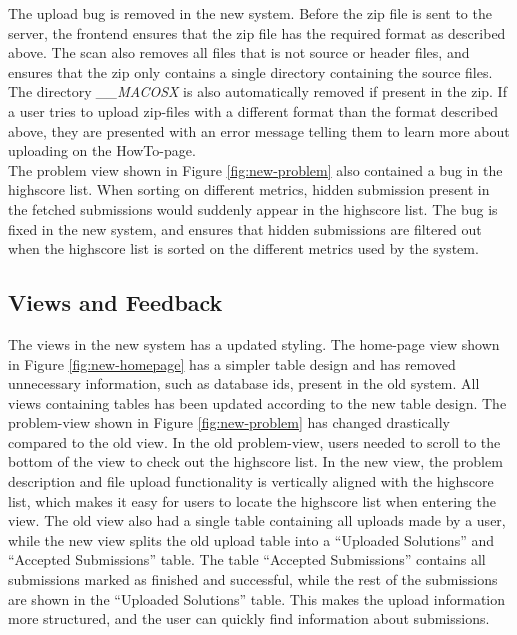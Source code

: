 The upload bug is removed in the new system. Before the zip file is sent to the server, the frontend ensures that the zip file has the required format as described above. The scan also removes all files that is not source or header files, and ensures that the zip only contains a single directory containing the source files. The directory \textit{\_\_MACOSX} is also automatically removed if present in the zip. If a user tries to upload zip-files with a different format than the format described above, they are presented with an error message telling them to learn more about uploading on the HowTo-page. \\

The problem view shown in Figure \ref{fig:new-problem} also contained a bug in the highscore list. When sorting on different metrics, hidden submission present in the fetched submissions would suddenly appear in the highscore list. The bug is fixed in the new system, and ensures that hidden submissions are filtered out when the highscore list is sorted on the different metrics used by the system.

\subsection{Views and Feedback}
The views in the new system has a updated styling. The home-page view shown in Figure \ref{fig:new-homepage} has a simpler table design and has removed unnecessary information, such as database ids, present in the old system. All views containing tables has been updated according to the new table design. The problem-view shown in Figure \ref{fig:new-problem} has changed drastically compared to the old view. In the old problem-view, users needed to scroll to the bottom of the view to check out the highscore list. In the new view, the problem description and file upload functionality is vertically aligned with the highscore list, which makes it easy for users to locate the highscore list when entering the view. The old view also had a single table containing all uploads made by a user, while the new view splits the old upload table into a  ``Uploaded Solutions'' and ``Accepted Submissions'' table. The table ``Accepted Submissions'' contains all submissions marked as finished and successful, while the rest of the submissions are shown in the ``Uploaded Solutions'' table. This makes the upload information more structured, and the user can quickly find information about submissions. \\

